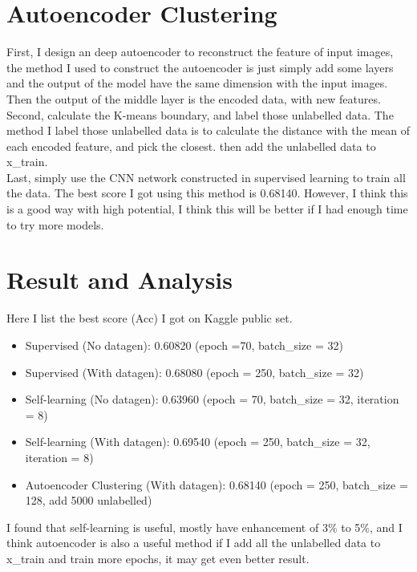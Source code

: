 \documentclass[11pt]{article}
\newcommand\n{\mbox{\qquad}}
\begin{document}
\section{Autoencoder Clustering}
\n First, I design an deep autoencoder to reconstruct the feature of input images, the method I used to construct the autoencoder is just simply add some layers and the output of the model have the same dimension with the input images. Then the output of the middle layer is the encoded data, with new features.\\
\n Second, calculate the K-means boundary, and label those unlabelled data. The method I label those unlabelled data is to calculate the distance with the mean of each encoded feature, and pick the closest. then add the unlabelled data to x\_train.\\
\n Last, simply use the CNN network constructed in supervised learning to train all the data. The best score I got using this method is 0.68140. However, I think this is a good way with high potential, I think this will be better if I had enough time to try more models.


\newpage
\section{Result and Analysis}
\n Here I list the best score (Acc) I got on Kaggle public set.
\begin{itemize}
	\item Supervised (No datagen): 0.60820 (epoch =70, batch\_size = 32)
	\item Supervised (With datagen): 0.68080 (epoch = 250, batch\_size = 32)
	\item Self-learning (No datagen): 0.63960 (epoch = 70, batch\_size = 32, iteration = 8)
	\item Self-learning (With datagen): 0.69540 (epoch = 250, batch\_size = 32, iteration = 8)
	\item Autoencoder Clustering (With datagen): 0.68140 (epoch = 250, batch\_size = 128, add 5000 unlabelled)
\end{itemize}
\n I found that self-learning is useful, mostly have enhancement of 3\% to 5\%, and I think autoencoder is also a useful method if I add all the unlabelled data to x\_train and train more epochs, it may get even better result.
\end{document}
